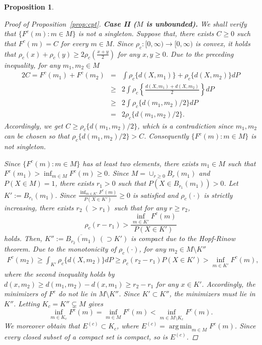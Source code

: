 \documentclass[preprint]{imsart}
\DeclareMathOperator*{\argmin}{arg\,min}
\theoremstyle{plain}
\newtheorem{proposition}{Proposition}
\theoremstyle{remark}
\begin{document}
\begin{appendix}
\begin{proposition}
\begin{proof}[Proof of Proposition~\ref{prop:cpt}]
\textbf{Case II ($M$ is unbounded).} We shall verify that $\{F^{c}(m): m \in M\}$ is not a singleton. Suppose that, there exists $C \ge 0$ such that $F^{c}(m)=C$ for every $m \in M$. Since $\rho_{c}:[0, \infty) \rightarrow [0, \infty)$ is  convex, it holds that $\rho_{c}(x) + \rho_{c}(y) \ge 2\rho_{c}(\frac{x+y}{2})$ for any $x, y \ge 0$. Due to the preceding inequality, for any $m_{1}, m_{2} \in M$
\begin{eqnarray*}
2C=F^{c}(m_{1})+F^{c}(m_2) &=& \int \rho_{c}\{d(X, m_{1})\} + \rho_{c}\{d(X, m_{2})\} dP \\
&\ge& 2 \int \rho_{c} \left\{\frac{d(X, m_{1}) + d(X, m_{2})}{2}\right\} dP \\
&\ge& 2 \int \rho_{c} \{ d(m_{1}, m_{2})/2 \}dP \\
&=& 2 \rho_{c} \{d(m_{1}, m_{2})/2\}.
\end{eqnarray*}
Accordingly, we get $C \ge \rho_{c}\{d(m_{1}, m_{2})/2\}$, which is a contradiction since $m_{1}, m_{2}$ can be chosen so that $\rho_{c}\{d(m_{1}, m_{2})/2\} > C$. Consequently $\{F^{c}(m): m\in M\}$ is not singleton. 

Since $\{F^{c}(m): m \in M \}$ has at least two elements, there exists $m_{1} \in M$ such that $F^{c}(m_{1}) > \inf_{m \in M} F^{c}(m) \ge 0$. Since $M=\cup_{r \ge 0} B_{r}(m_{1})$ and $P(X \in M)=1$, there exists $r_{1} > 0$ such that $P(X \in B_{r_{1}}(m_{1})) > 0$. Let $K':=B_{r_{1}}(m_1)$. Since $\frac{\inf_{m \in K'} F^{c}(m)}{P(X \in K')} \ge 0$ is satisfied and $\rho_{c}(\cdot)$ is strictly increasing, there exists $r_{2} ~(> r_{1})$ such that for any $r \ge r_{2}$, $$\rho_{c}(r - r_{1}) > \frac{\inf_{m \in K'}F^{c}(m)}{P(X \in K')}$$ holds. Then, $K'':=\overline{B_{r_{2}}(m_{1})} ~(\supset K')$ is compact due to the Hopf-Rinow theorem. Due to the monotonicity of $\rho_{c}(\cdot)$, for any $m_{2} \in M \setminus K''$
\begin{eqnarray*}
F^{c}(m_{2}) \ge \int_{K'} \rho_{c}\{d(X, m_{2})\}dP \ge \rho_{c}(r_{2} - r_{1})P(X \in K') > \inf_{m \in K'} F^{c}(m),  
\end{eqnarray*}
where the second inequality holds by $d(x, m_{2}) \ge d(m_{1}, m_{2}) - d(x, m_{1}) \ge r_{2} - r_{1}$ for any $x \in K'$. Accordingly, the minimizers of $F^{c}$ do not lie in $M\setminus K''$. Since $K' \subset K''$, the minimizers must lie in $K''$. Letting $K_{c}=K'' \subsetneq M$ gives 
\[
\inf_{m \in K_{c}} F^{c}(m) = \inf_{m \in M} F^{c}(m) < \inf_{m \in M \setminus K_{c}} F^{c}(m).
\]
We moreover obtain that $E^{(c)} \subset K_{c}$, where $E^{(c)}=\argmin_{m \in M} F^{c}(m)$. Since every closed subset of a compact set is compact, so is $E^{(c)}$.
\end{proof}
\end{proposition}



\end{appendix}
\end{document}
